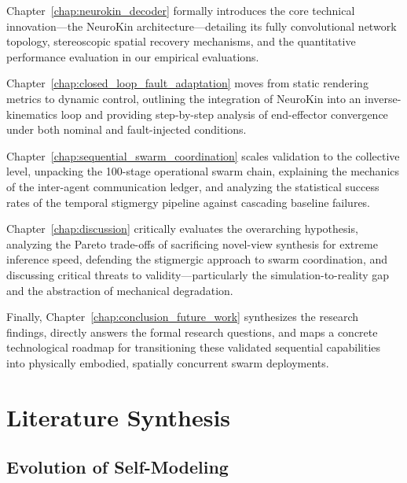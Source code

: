 \documentclass[12pt,a4paper,oneside]{report}
\begin{document}
Chapter~\ref{chap:neurokin_decoder} formally introduces the core technical innovation—the NeuroKin architecture—detailing its fully convolutional network topology, stereoscopic spatial recovery mechanisms, and the quantitative performance evaluation in our empirical evaluations.

Chapter~\ref{chap:closed_loop_fault_adaptation} moves from static rendering metrics to dynamic control, outlining the integration of NeuroKin into an inverse-kinematics loop and providing step-by-step analysis of end-effector convergence under both nominal and fault-injected conditions.

Chapter~\ref{chap:sequential_swarm_coordination} scales validation to the collective level, unpacking the 100-stage operational swarm chain, explaining the mechanics of the inter-agent communication ledger, and analyzing the statistical success rates of the temporal stigmergy pipeline against cascading baseline failures.

Chapter~\ref{chap:discussion} critically evaluates the overarching hypothesis, analyzing the Pareto trade-offs of sacrificing novel-view synthesis for extreme inference speed, defending the stigmergic approach to swarm coordination, and discussing critical threats to validity—particularly the simulation-to-reality gap and the abstraction of mechanical degradation.

Finally, Chapter~\ref{chap:conclusion_future_work} synthesizes the research findings, directly answers the formal research questions, and maps a concrete technological roadmap for transitioning these validated sequential capabilities into physically embodied, spatially concurrent swarm deployments.












\chapter{Literature Synthesis}
\label{chap:literature_synthesis}

\section{Evolution of Self-Modeling}
\end{document}
